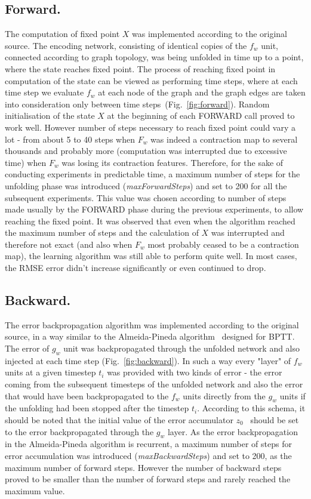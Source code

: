 \documentclass[a4paper, 11pt, twocolumn]{spie}  %
\begin{document}
\subsection{Forward.}
The computation of fixed point $X$ was implemented according to the original source. The encoding network, consisting of identical copies of the $f_w$ unit, connected according to graph topology, was being unfolded in time up to a point, where the state reaches fixed point. The process of reaching fixed point in computation of the state can be viewed as performing time steps, where at each time step we evaluate $f_w$ at each node of the graph and the graph edges are taken into consideration only between time steps~(Fig.~\ref{fig:forward}). Random initialisation of the state $X$ at the beginning of each FORWARD call proved to work well. However number of steps necessary to reach fixed point could vary a lot - from about 5 to 40 steps when $F_w$ was indeed a contraction map to several thousands and probably more (computation was interrupted due to excessive time) when $F_w$ was losing its contraction features. Therefore, for the sake of conducting experiments in predictable time, a maximum number of steps for the unfolding phase was introduced (\emph{maxForwardSteps}) and set to 200 for all the subsequent experiments. This value was chosen according to number of steps made usually by the FORWARD phase during the previous experiments, to allow reaching the fixed point.
\newpage \noindent It was observed that even when the algorithm reached the maximum number of steps and the calculation of $X$ was interrupted and therefore not exact (and also when $F_w$ most probably ceased to be a contraction map), the learning algorithm was still able to perform quite well. In most cases, the RMSE error didn't increase significantly or even continued to drop.


\subsection{Backward.}
The error backpropagation algorithm was implemented according to the original source, in a way similar to the Almeida-Pineda algorithm~\cite{williams1995gradient} designed for BPTT. The error of $g_w$ unit was backpropagated through the unfolded network and also injected at each time step (Fig.~\ref{fig:backward}). In such a way every "layer" of $f_w$ units at a given timestep $t_i$ was provided with two kinds of error - the error coming from the subsequent timesteps of the unfolded network and also the error that would have been backpropagated to the $f_w$ units directly from the $g_w$ units if the unfolding had been stopped after the timestep $t_i$. According to this schema, it should be noted that the initial value of the error accumulator $z_0$~\cite{scarselli2009graph} should be set to the error backpropagated through the $g_w$ layer. As the error backpropagation in the Almeida-Pineda algorithm is recurrent, a maximum number of steps for error accumulation was introduced (\emph{maxBackwardSteps}) and set to 200, as the maximum number of forward steps. However the number of backward steps proved to be smaller than the number of forward steps and rarely reached the maximum value.
\end{document}

